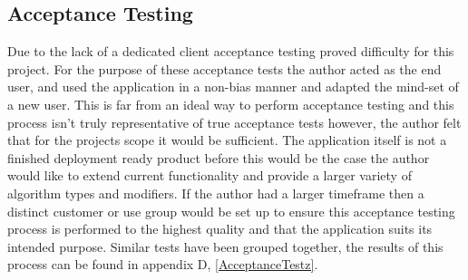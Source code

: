 \subsection{Acceptance Testing}

Due to the lack of a dedicated client acceptance testing proved difficulty for this project. For the purpose of these acceptance tests the author acted as the end user, and used the application in a non-bias manner and adapted the mind-set of a new user. This is far from an ideal way to perform acceptance testing and this process isn’t truly representative of true acceptance tests however, the author felt that for the projects scope it would be sufficient. The application itself is not a finished deployment ready product before this would be the case the author would like to extend current functionality and provide a larger variety of algorithm types and modifiers. If the author had a larger timeframe then a distinct customer or use group would be set up to ensure this acceptance testing process is performed to the highest quality and that the application suits its intended purpose. Similar tests have been grouped together, the results of this process can be found in appendix D, \ref{AcceptanceTestz}.